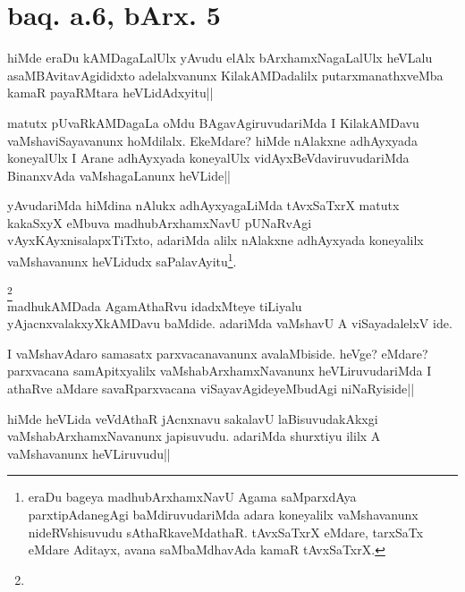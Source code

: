 
\section*{baq. a.6, bArx. 5}

\begin{artha}
hiMde eraDu kAMDagaLalUlx yAvudu elAlx bArxhamxNagaLalUlx heVLalu 
asaMBAvitavAgididxto adelalxvanunx KilakAMDadalilx putarxmanathxveMba 
kamaR payaRMtara heVLidAdxyitu||
\end{artha}

\begin{artha}
matutx pUvaRkAMDagaLa oMdu BAgavAgiruvudariMda I KilakAMDavu 
vaMshaviSayavanunx hoMdilalx. EkeMdare? hiMde nAlakxne adhAyxyada 
koneyalUlx I Arane adhAyxyada koneyalUlx vidAyxBeVdaviruvudariMda 
BinanxvAda vaMshagaLanunx heVLide||
\end{artha}


\begin{artha}
yAvudariMda hiMdina nAlukx adhAyxyagaLiMda tAvxSaTxrX matutx kakaSxyX 
eMbuva madhubArxhamxNavU pUNaRvAgi vAyxKAyxnisalapxTiTxto, adariMda 
alilx nAlakxne adhAyxyada koneyalilx vaMshavanunx heVLidudx 
saPalavAyitu\footnote[1]{eraDu bageya madhubArxhamxNavU Agama 
saMparxdAya parxtipAdanegAgi baMdiruvudariMda adara koneyalilx 
vaMshavanunx nideRVshisuvudu sAthaRkaveMdathaR. tAvxSaTxrX eMdare, 
tarxSaTx eMdare Aditayx, avana saMbaMdhavAda kamaR tAvxSaTxrX.}.
\end{artha}

\begin{artha}
\footnote[1]{}\\
madhukAMDada AgamAthaRvu idadxMteye tiLiyalu yAjacnxvalakxyXkAMDavu 
baMdide. adariMda vaMshavU A viSayadalelxV ide.
\end{artha}

\begin{artha}
I vaMshavAdaro samasatx parxvacanavanunx avalaMbiside. heVge? eMdare? 
parxvacana samApitxyalilx vaMshabArxhamxNavanunx heVLiruvudariMda I 
athaRve aMdare savaRparxvacana viSayavAgideyeMbudAgi niNaRyiside||
\end{artha}


\begin{artha}
hiMde heVLida veVdAthaR jAcnxnavu sakalavU laBisuvudakAkxgi 
vaMshabArxhamxNavanunx japisuvudu. adariMda shurxtiyu ililx A 
vaMshavanunx heVLiruvudu||
\end{artha}

